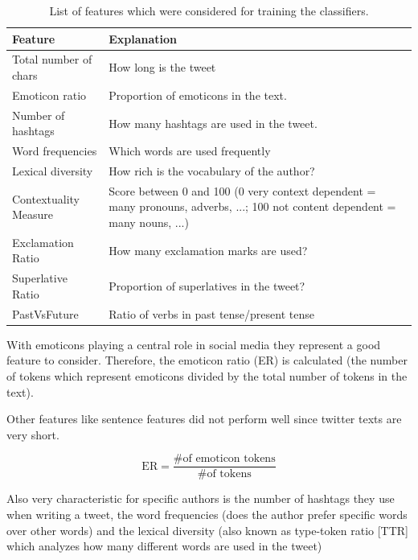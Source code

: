 \documentclass[journal, a4paper, 12pt]{IEEEtran}
\begin{document}
\begin{table}[!hbt]
	\begin{center}
		\caption{List of features which were considered for training the classifiers.}
		\label{tab:features}
		\begin{tabularx}{80mm}{| l | X |}
			\hline
			\rowcolor{lightgray}
			\textbf{Feature}			& \textbf{Explanation}						\\ \hline\hline
			Total number of chars		& How long is the tweet						\\ \hline
			Emoticon ratio		  	& Proportion of emoticons in the text. 			\\ \hline
			Number of hashtags		& How many hashtags are used in the tweet. 	\\ \hline
			Word frequencies        	& Which words are used frequently 				\\ \hline
			Lexical diversity			& How rich is the vocabulary of the author? 		\\ \hline
			Contextuality Measure		& Score between 0 and 100
								  	(0 very context dependent = many pronouns, adverbs, ...;
									100 not content dependent = many nouns, ...) 
																				\\ \hline
			Exclamation Ratio			& How many exclamation marks are used?		\\ \hline
			Superlative Ratio			& Proportion of superlatives in the tweet?		\\ \hline
			PastVsFuture				& Ratio of verbs in past tense/present tense		\\ \hline
			\hline
		\end{tabularx}
	\end{center}
\end{table}

With emoticons playing a central role in social media they represent a good feature to consider. Therefore, the emoticon ratio (ER) is calculated (the number of tokens which represent emoticons divided by the total number of tokens in the text).

Other features like sentence features did not perform well since twitter texts are very short.

\begin{equation}
	\text{ER} = \frac{\text{\# of emoticon tokens}}{\text{\# of tokens}}
\end{equation}

Also very characteristic for specific authors is the number of hashtags they use when writing a tweet, the word frequencies (does the author prefer specific words over other words) and the lexical diversity (also known as type-token ratio [TTR] which analyzes how many different words are used in the tweet)
\end{document}
